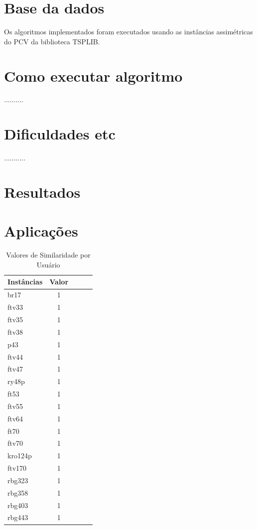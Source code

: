 \documentclass[12pt]{article}
\begin{document}
\section{Base da dados}
Os algoritmos implementados foram executados usando as instâncias assimétricas do PCV da biblioteca TSPLIB.





\section{Como executar algoritmo} \label{sec:firstpage}

..........

\section{Dificuldades etc}

...........

\section{Resultados}

\section{Aplicações}

\begin{table}[!ht]
	\centering
	\caption{Valores de Similaridade por Usuário}
	\label{citacao6}
	\begin{tabular}{lcccc}
		\toprule
		\textbf{Instâncias}    & \textbf{Valor} \\ \midrule
		br17    & 1     \\ \midrule
		ftv33 & 1   \\ \midrule
		ftv35 & 1 \\ \midrule
		ftv38  & 1    \\ \midrule
		p43    & 1     \\ \midrule
		ftv44 & 1   \\ \midrule
		ftv47  & 1    \\ \midrule
		ry48p    & 1     \\ \midrule
		ft53 & 1   \\ \midrule
		ftv55  & 1    \\ \midrule
		ftv64    & 1     \\ \midrule
		ft70 & 1   \\ \midrule
		ftv70  & 1    \\ \midrule
		kro124p    & 1     \\ \midrule
		ftv170 & 1   \\ \midrule
		rbg323  & 1    \\ \midrule
		rbg358    & 1     \\ \midrule
		rbg403 & 1   \\ \midrule
		rbg443   & 1    \\ \bottomrule
	\end{tabular}
\end{table}
\end{document}
